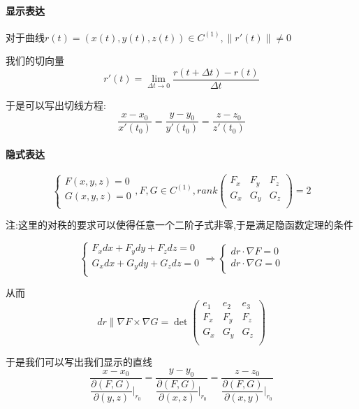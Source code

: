 \documentclass[11pt,hyperref,a4paper,UTF8]{ctexart}
\begin{document}
\begin{CJK}{UTF8}{gkai}
\paragraph{显示表达\\}

对于曲线$r(t) = (x(t),y(t),z(t)) \in C^{(1)}, \|r'(t)\| \neq 0 $

我们的切向量
\[r'(t) = \lim_{\Delta t \to 0} \frac{r(t + \Delta t) - r(t)}{\Delta t}\]

于是可以写出切线方程:
\[\frac{x - x_0}{x'(t_0)} = \frac{y - y_0}{y'(t_0)} = \frac{z - z_0}{z'(t_0)}\]

\paragraph{隐式表达\\}
\[\begin{cases}
  F(x,y,z) = 0\\
  G(x,y,z) = 0\\
\end{cases},F,G \in C^{(1)}, rank\begin{pmatrix}
  F_x&F_y&F_z\\
  G_x&G_y&G_z\\
\end{pmatrix} = 2\]

注:这里的对秩的要求可以使得任意一个二阶子式非零,于是满足隐函数定理的条件

\[\begin{cases}
  F_x dx + F_y dy + F_z dz = 0\\
  G_x dx + G_y dy + G_z dz = 0\\
\end{cases}
\Rightarrow
\begin{cases}
  dr \cdot \nabla F  = 0\\
  dr \cdot \nabla G  = 0\\
\end{cases}
\]

从而
\[dr \parallel \nabla F \times \nabla G = \det \begin{pmatrix}
  e_1&e_2&e_3\\
  F_x&F_y&F_z\\
  G_x&G_y&G_z\\
\end{pmatrix}\]

于是我们可以写出我们显示的直线
\[\frac{x - x_0}{\dfrac{\partial(F,G)}{\partial(y,z)}\bigg|_{r_0}} = \frac{y - y_0}{\dfrac{\partial(F,G)}{\partial(x,z)}\bigg|_{r_0}} = \frac{z - z_0}{\dfrac{\partial(F,G)}{\partial(x,y)}\bigg|_{r_0}}\]


\end{CJK}
\end{document}
